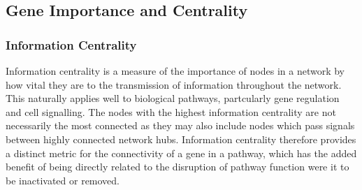 \begin{table*}[!htb]
\caption{\gls{ANOVA} for Synthetic Lethality and Vertex Degree}
\label{tab:SL_Pathway_PI3K_Vertex_Degree}
\noindent{}
\end{table*}

\FloatBarrier

\subsection{Gene Importance and Centrality}  \label{chapt4:Network_Centrality}

\subsubsection{Information Centrality}  \label{chapt4:Network_InfoCent}

Information centrality is a measure of the importance of nodes in a network by how vital they are to the transmission of information throughout the network. This naturally applies well to biological pathways, partcularly gene regulation and cell signalling. The nodes with the highest information centrality are not necessarily the most connected as they may also include nodes which pass signals between highly connected network hubs. Information centrality therefore provides a distinct metric for the connectivity of a gene in a pathway, which has the added benefit of being directly related to the disruption of pathway function were it to be inactivated or removed.

